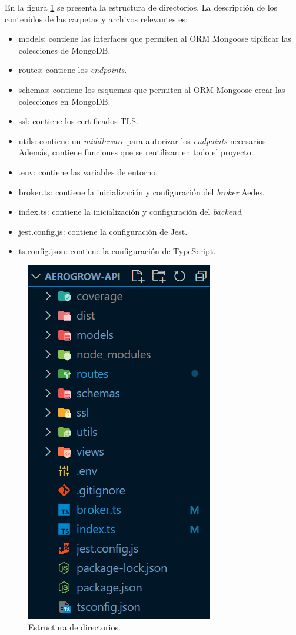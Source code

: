 En la figura \ref{fig:estructuraDeDirectoriosDelBackend} se presenta la estructura de directorios. La descripción de los contenidos de las carpetas y archivos relevantes es:
\begin{itemize}
	\item models: contiene las interfaces que permiten al ORM Mongoose tipificar las colecciones de MongoDB.
	\item routes: contiene los \emph{endpoints}.
	\item schemas: contiene los esquemas que permiten al ORM Mongoose crear las colecciones en MongoDB.
	\item ssl: contiene los certificados TLS.
	\item utils: contiene un \emph{middleware} para autorizar los \emph{endpoints} necesarios. Además, contiene funciones que se reutilizan en todo el proyecto.
	\item .env: contiene las variables de entorno.
	\item broker.ts: contiene la inicialización y configuración del \emph{broker} Aedes.
	\item index.ts: contiene la inicialización y configuración del \emph{backend}.
	\item jest.config.js: contiene la configuración de Jest.
	\item ts.config.json: contiene la configuración de TypeScript.
\end{itemize}

\begin{figure}[H]
	\centering
	\includegraphics[width=.4\textwidth]{./Figures/Estructura de directorios del backend.png}
	\caption{Estructura de directorios.}
	\label{fig:estructuraDeDirectoriosDelBackend}
\end{figure}

